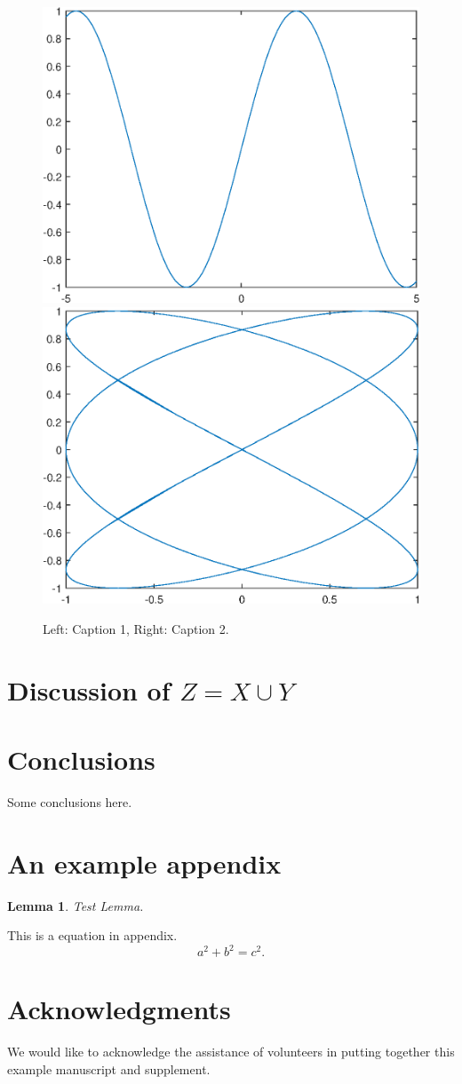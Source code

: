 \documentclass[10pt,reqno,final]{article}
\theoremstyle{plain}
\newtheorem{lemma}[theorem]{Lemma}
\theoremstyle{definition}
\theoremstyle{remark}
\begin{document}
\lipsum[48]

\begin{figure}[htp!]
  \centering
  \includegraphics[width=0.48\linewidth]{fig1}
  \hfill
  \includegraphics[width=0.48\linewidth]{fig2}
  \caption{Left: Caption 1, Right: Caption 2.}
  \label{fig:b}
\end{figure}


\section{Discussion of \texorpdfstring{{\boldmath$Z=X \cup Y$}}{Z = X union Y}}

\lipsum[76]

\section{Conclusions}
\label{sec:conclusions}

Some conclusions here.


\appendix
\section{An example appendix}
\lipsum[71]

\begin{lemma}
Test Lemma.
\end{lemma}

This is a equation in appendix.
\begin{equation}\label{eq:A1}
  a^2+b^2=c^2.
\end{equation}

\section*{Acknowledgments}
We would like to acknowledge the assistance of volunteers in putting
together this example manuscript and supplement.



%


\end{document}

